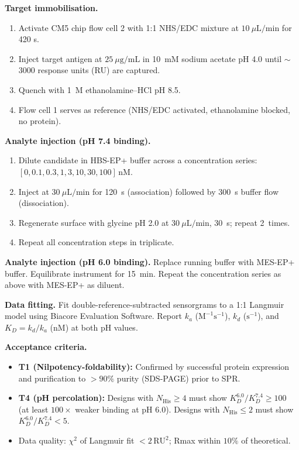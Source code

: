\noindent\textbf{Target immobilisation.}
\begin{enumerate}[leftmargin=1.5cm, label=\arabic*.]
  \item Activate CM5 chip flow cell 2 with 1:1 NHS/EDC mixture at
        $10~\mu\mathrm{L/min}$ for 420 s.
  \item Inject target antigen at $25~\mu\mathrm{g/mL}$ in 10~mM sodium
        acetate pH 4.0 until $\sim$3000 response units (RU) are captured.
  \item Quench with 1~M ethanolamine--HCl pH 8.5.
  \item Flow cell 1 serves as reference (NHS/EDC activated, ethanolamine
        blocked, no protein).
\end{enumerate}

\noindent\textbf{Analyte injection (pH 7.4 binding).}
\begin{enumerate}[leftmargin=1.5cm, label=\arabic*.]
  \item Dilute candidate in HBS-EP+ buffer across a concentration series:
        $[0, 0.1, 0.3, 1, 3, 10, 30, 100]\,\mathrm{nM}$.
  \item Inject at $30~\mu\mathrm{L/min}$ for 120~s (association) followed by
        300~s buffer flow (dissociation).
  \item Regenerate surface with glycine pH 2.0 at $30~\mu\mathrm{L/min}$,
        30~s; repeat 2~times.
  \item Repeat all concentration steps in triplicate.
\end{enumerate}

\noindent\textbf{Analyte injection (pH 6.0 binding).}
Replace running buffer with MES-EP+ buffer.  Equilibrate instrument for 15~min.
Repeat the concentration series as above with MES-EP+ as diluent.

\noindent\textbf{Data fitting.}  Fit double-reference-subtracted sensorgrams to
a 1:1 Langmuir model using Biacore Evaluation Software.  Report $k_a$
($\mathrm{M}^{-1}\mathrm{s}^{-1}$), $k_d$ ($\mathrm{s}^{-1}$), and
$K_D = k_d / k_a$ (nM) at both pH values.

\noindent\textbf{Acceptance criteria.}
\begin{itemize}[leftmargin=1.2cm]
  \item \textbf{T1 (Nilpotency-foldability):} Confirmed by successful protein
        expression and purification to $> 90\%$ purity (SDS-PAGE) prior to SPR.
  \item \textbf{T4 (pH percolation):} Designs with $N_{\text{His}} \ge 4$
        must show $K_D^{6.0} / K_D^{7.4} \ge 100$ (at least $100\times$
        weaker binding at pH 6.0).  Designs with $N_{\text{His}} \le 2$ must
        show $K_D^{6.0} / K_D^{7.4} < 5$.
  \item Data quality: $\chi^2$ of Langmuir fit $< 2\,\text{RU}^2$;
        Rmax within $10\%$ of theoretical.
\end{itemize}

